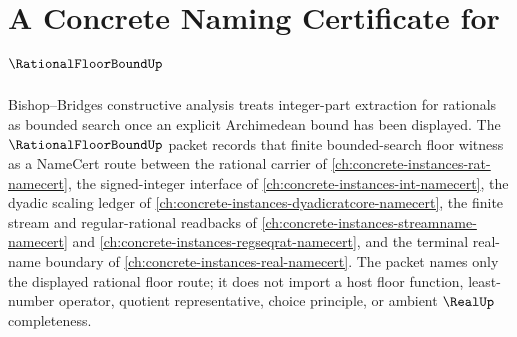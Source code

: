 \chapter{A Concrete Naming Certificate for $\RationalFloorBoundUp$}
\label{ch:concrete-instances-rational-floor-bound-namecert}

Bishop--Bridges constructive analysis treats integer-part extraction for rationals as bounded search once an explicit Archimedean bound has been displayed. The $\RationalFloorBoundUp$ packet records that finite bounded-search floor witness as a NameCert route between the rational carrier of \autoref{ch:concrete-instances-rat-namecert}, the signed-integer interface of \autoref{ch:concrete-instances-int-namecert}, the dyadic scaling ledger of \autoref{ch:concrete-instances-dyadicratcore-namecert}, the finite stream and regular-rational readbacks of \autoref{ch:concrete-instances-streamname-namecert} and \autoref{ch:concrete-instances-regseqrat-namecert}, and the terminal real-name boundary of \autoref{ch:concrete-instances-real-namecert}. The packet names only the displayed rational floor route; it does not import a host floor function, least-number operator, quotient representative, choice principle, or ambient $\RealUp$ completeness.

